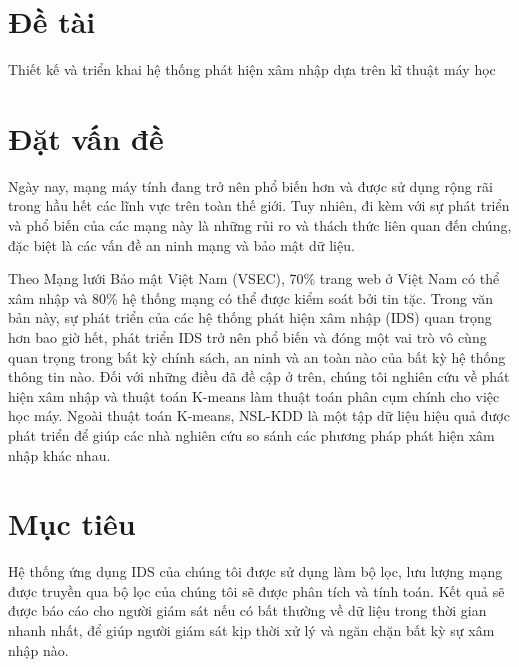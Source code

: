 \section{Đề tài}
Thiết kế và triển khai hệ thống phát hiện xâm nhập dựa trên kĩ thuật máy học
\section{Đặt vấn đề}
Ngày nay, mạng máy tính đang trở nên phổ biến hơn và được sử dụng rộng rãi trong hầu hết các lĩnh vực trên toàn thế giới. 
Tuy nhiên, đi kèm với sự phát triển và phổ biến của các mạng này là những rủi ro và thách thức liên quan đến chúng, đặc biệt là các vấn đề an ninh mạng và bảo mật dữ liệu.
\par
Theo Mạng lưới Bảo mật Việt Nam (VSEC), 70\% trang web ở Việt Nam có thể xâm nhập và 80\% hệ thống mạng có thể được kiểm soát bởi tin tặc. 
Trong văn bản này, sự phát triển của các hệ thống phát hiện xâm nhập (IDS) quan trọng hơn bao giờ hết, phát triển IDS trở nên phổ biến và đóng một vai trò vô cùng quan trọng trong bất kỳ chính sách, an ninh và an toàn nào của bất kỳ hệ thống thông tin nào. 
Đối với những điều đã đề cập ở trên, chúng tôi nghiên cứu về phát hiện xâm nhập và thuật toán K-means làm thuật toán phân cụm chính cho việc học máy. 
Ngoài thuật toán K-means, NSL-KDD là một tập dữ liệu hiệu quả được phát triển để giúp các nhà nghiên cứu so sánh các phương pháp phát hiện xâm nhập khác nhau. 
\section{Mục tiêu}
Hệ thống ứng dụng IDS của chúng tôi được sử dụng làm bộ lọc, lưu lượng mạng được truyền qua bộ lọc của chúng tôi sẽ được phân tích và tính toán. 
Kết quả sẽ được báo cáo cho người giám sát nếu có bất thường về dữ liệu trong thời gian nhanh nhất, để giúp người giám sát kịp thời xử lý và ngăn chặn bất kỳ sự xâm nhập nào.
